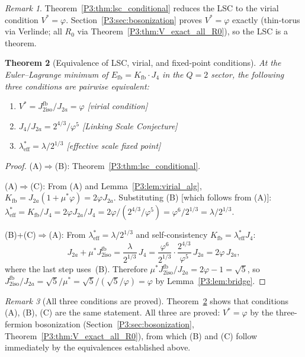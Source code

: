\documentclass[11pt,a4paper]{article}
\newtheorem{theorem}{Theorem}[section]
\theoremstyle{definition}
\theoremstyle{remark}
\newtheorem{remark}[theorem]{Remark}
\newcommand{\vp}{\varphi}
\newcommand{\lam}{\lambda}
\newcommand{\Kfb}{K_{\mathrm{fb}}}
\newcommand{\Jfb}{J_{2\mathrm{iso}}^{\mathrm{fb}}}
\newcommand{\Ja}{J_{2a}}
\newcommand{\Jfour}{J_{4}}
\newcommand{\leff}{\lambda_{\mathrm{eff}}}
\begin{document}
\begin{remark}
\label{P3:rem:lsc_conditional_status}
Theorem~\ref{P3:thm:lsc_conditional} reduces the LSC to the virial
condition $V^*=\vp$.  Section~\ref{P3:sec:bosonization} proves $V^*=\vp$
exactly (thin-torus via Verlinde; all $R_0$ via Theorem~\ref{P3:thm:V_exact_all_R0}),
so the LSC is a theorem.
\end{remark}

\begin{theorem}[Equivalence of LSC, virial, and fixed-point conditions]
\label{P3:thm:lsc_equivalence}
At the Euler--Lagrange minimum of $E_{\mathrm{fb}} = \Kfb\cdot\Jfour$
in the $Q=2$ sector, the following three conditions are
\emph{pairwise equivalent}:
\begin{enumerate}[noitemsep,label=\textup{(\Alph*)}]
  \item $V^* = \Jfb/\Ja = \vp$ \hfill\textup{[virial condition]}
  \item $\Jfour/\Ja = 2^{4/3}/\vp^5$ \hfill\textup{[Linking Scale Conjecture]}
  \item $\leff^* = \lam/2^{1/3}$ \hfill\textup{[effective scale fixed point]}
\end{enumerate}
\end{theorem}

\begin{proof}
\textup{(A)$\Rightarrow$(B)}: Theorem~\ref{P3:thm:lsc_conditional}.

\textup{(A)$\Rightarrow$(C)}: 
From (A) and Lemma~\ref{P3:lem:virial_alg},
$\Kfb = \Ja(1+\mu^*\vp) = 2\vp\Ja$.
Substituting (B) [which follows from (A)]:
$\leff^* = \Kfb/\Jfour = 2\vp\Ja/\Jfour = 2\vp/(2^{4/3}/\vp^5) = \vp^6/2^{1/3} = \lam/2^{1/3}$.

\textup{(B)+(C)$\Rightarrow$(A)}: 
From $\leff^* = \lam/2^{1/3}$ and self-consistency $\Kfb = \leff^*\Jfour$:
\begin{equation}
  \Ja + \mu^*\Jfb 
  = \frac{\lam}{2^{1/3}}\,\Jfour
  = \frac{\vp^6}{2^{1/3}}\cdot\frac{2^{4/3}}{\vp^5}\,\Ja
  = 2\vp\,\Ja,
  \label{P3:eq:equiv_chain}
\end{equation}
where the last step uses~(B).  Therefore
$\mu^*\Jfb/\Ja = 2\vp - 1 = \sqrt{5}$, so
$\Jfb/\Ja = \sqrt{5}/\mu^* = \sqrt{5}/(\sqrt{5}/\vp) = \vp$
by Lemma~\ref{P3:lem:bridge}.
\end{proof}

\begin{remark}[All three conditions are proved]
\label{P3:rem:all_three_proved}
Theorem~\ref{P3:thm:lsc_equivalence} shows that conditions (A), (B), (C) are
the same statement.  All three are proved: $V^*=\vp$ by the
three-fermion bosonization (Section~\ref{P3:sec:bosonization},
Theorem~\ref{P3:thm:V_exact_all_R0}), from which (B) and (C) follow
immediately by the equivalences established above.
\end{remark}
\end{document}
